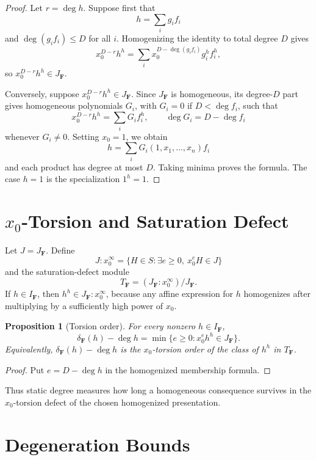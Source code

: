 \documentclass[11pt]{article}
\newtheorem{proposition}[theorem]{Proposition}
\begin{document}
\begin{proof}
Let \(r=\deg h\). Suppose first that
\[
h=\sum_i g_i f_i
\]
and \(\deg(g_i f_i)\le D\) for all \(i\). Homogenizing the identity to total degree \(D\) gives
\[
x_0^{D-r}h^h
=
\sum_i x_0^{D-\deg(g_i f_i)}g_i^h f_i^h,
\]
so \(x_0^{D-r}h^h\in J_{\mathbf F}\).

Conversely, suppose \(x_0^{D-r}h^h\in J_{\mathbf F}\). Since \(J_{\mathbf F}\) is homogeneous, its degree-\(D\) part gives homogeneous polynomials \(G_i\), with \(G_i=0\) if \(D<\deg f_i\), such that
\[
x_0^{D-r}h^h=\sum_i G_i f_i^h,\qquad \deg G_i=D-\deg f_i
\]
whenever \(G_i\ne0\). Setting \(x_0=1\), we obtain
\[
h=\sum_i G_i(1,x_1,\ldots,x_n)f_i
\]
and each product has degree at most \(D\). Taking minima proves the formula. The case \(h=1\) is the specialization \(1^h=1\).
\end{proof}

\section{\texorpdfstring{\(x_0\)}{x0}-Torsion and Saturation Defect}

Let \(J=J_{\mathbf F}\). Define
\[
J:x_0^\infty=\{H\in S:\exists e\ge0,\ x_0^eH\in J\}
\]
and the saturation-defect module
\[
T_{\mathbf F}=(J_{\mathbf F}:x_0^\infty)/J_{\mathbf F}.
\]
If \(h\in I_{\mathbf F}\), then \(h^h\in J_{\mathbf F}:x_0^\infty\), because any affine expression for \(h\) homogenizes after multiplying by a sufficiently high power of \(x_0\).

\begin{proposition}[Torsion order]
For every nonzero \(h\in I_{\mathbf F}\),
\[
\delta_{\mathbf F}(h)-\deg h
=
\min\{e\ge0:x_0^e h^h\in J_{\mathbf F}\}.
\]
Equivalently, \(\delta_{\mathbf F}(h)-\deg h\) is the \(x_0\)-torsion order of the class of \(h^h\) in \(T_{\mathbf F}\).
\end{proposition}

\begin{proof}
Put \(e=D-\deg h\) in the homogenized membership formula.
\end{proof}

Thus static degree measures how long a homogeneous consequence survives in the \(x_0\)-torsion defect of the chosen homogenized presentation.

\section{Degeneration Bounds}
\end{document}

